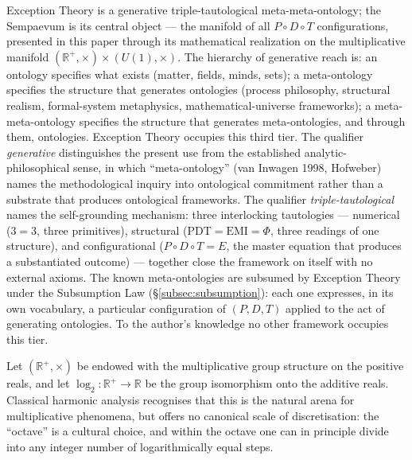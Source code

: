 \documentclass[11pt,a4paper]{article}
\theoremstyle{definition}
\theoremstyle{remark}
\newcommand{\R}{\mathbb{R}}
\begin{document}
Exception Theory is a generative triple-tautological meta-meta-ontology; the Sempaevum is its central object --- the manifold of all $P\circ D\circ T$ configurations, presented in this paper through its mathematical realization on the multiplicative manifold $(\R^{+},\times) \times (U(1),\times)$. The hierarchy of generative reach is: an ontology specifies what exists (matter, fields, minds, sets); a meta-ontology specifies the structure that generates ontologies (process philosophy, structural realism, formal-system metaphysics, mathematical-universe frameworks); a meta-meta-ontology specifies the structure that generates meta-ontologies, and through them, ontologies. Exception Theory occupies this third tier. The qualifier \emph{generative} distinguishes the present use from the established analytic-philosophical sense, in which ``meta-ontology'' (van Inwagen 1998, Hofweber) names the methodological inquiry into ontological commitment rather than a substrate that produces ontological frameworks. The qualifier \emph{triple-tautological} names the self-grounding mechanism: three interlocking tautologies --- numerical ($3 = 3$, three primitives), structural ($\mathrm{PDT} = \mathrm{EMI} = \Phi$, three readings of one structure), and configurational ($P \circ D \circ T = E$, the master equation that produces a substantiated outcome) --- together close the framework on itself with no external axioms. The known meta-ontologies are subsumed by Exception Theory under the Subsumption Law (\S\ref{subsec:subsumption}): each one expresses, in its own vocabulary, a particular configuration of $(P, D, T)$ applied to the act of generating ontologies. To the author's knowledge no other framework occupies this tier.

Let $(\R^{+},\times)$ be endowed with the multiplicative group structure on the positive reals, and let $\log_{2}:\R^{+}\to\R$ be the group isomorphism onto the additive reals. Classical harmonic analysis recognises that this is the natural arena for multiplicative phenomena, but offers no canonical scale of discretisation: the ``octave'' is a cultural choice, and within the octave one can in principle divide into any integer number of logarithmically equal steps.
\end{document}
